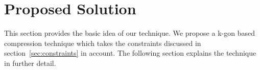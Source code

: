 \documentclass[conference]{IEEEtran}
\begin{document}
%
%
\section{Proposed Solution}
\label{s:proposed-solution}
This section provides the basic idea of our technique. We propose a k-gon based compression technique which 
takes the constraints discussed in section~\ref{sec:constraints} in account. The following section explains 
the technique in further detail.
%
\end{document}
